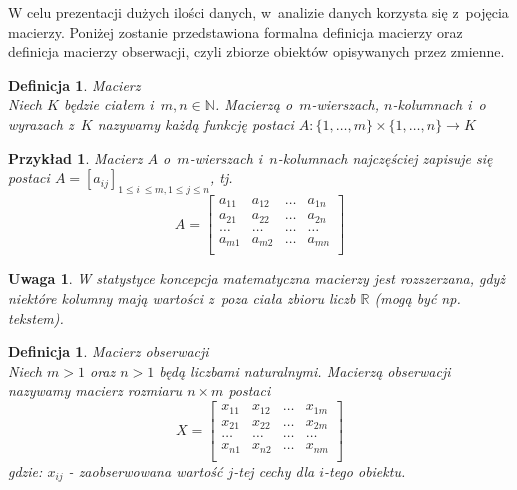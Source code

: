\documentclass[12pt,a4paper]{report}
\newtheorem{definition}[theorem]{Definicja}
\newtheorem{uwaga}{Uwaga}
\newtheorem{example}{Przykład}
\begin{document}
W celu prezentacji dużych ilości danych, w~analizie danych korzysta się z~pojęcia macierzy. Poniżej zostanie przedstawiona formalna definicja macierzy oraz definicja macierzy obserwacji, czyli zbiorze obiektów opisywanych przez zmienne. %

\begin{definition}{Macierz \cite[Rozdział 1]{banaszak2002}}\\
Niech $K$ będzie ciałem i~$m, n \in \mathbb{N}$. Macierzą o~$m$-wierszach, $n$-kolumnach i~o wyrazach z~$K$ nazywamy każdą funkcję postaci
$A: \{1,\ldots, m \} \times \{1, \ldots, n\} \rightarrow K$
\end{definition}

\begin{example}
Macierz $A$ o~$m$-wierszach i~$n$-kolumnach najczęściej zapisuje się postaci $A=[a_{ij}]_{1\leq i~\leq m,  1\leq j\leq n}$, tj. 
$$
A= \begin{bmatrix}
a_{11} & a_{12} & \ldots & a_{1n} \\
a_{21} & a_{22} & \ldots & a_{2n}\\ 
\ldots & \ldots & \ldots & \ldots\\
a_{m1} & a_{m2} & \ldots & a_{mn} \\
\end{bmatrix}    
$$
\end{example}

\begin{uwaga}
W statystyce koncepcja matematyczna macierzy jest rozszerzana, gdyż niektóre kolumny mają wartości z~poza ciała zbioru liczb $\mathbb{R}$ (mogą być np. tekstem).
\end{uwaga}

\begin{definition}{Macierz obserwacji \cite[Rozdział 2]{mlodak2006}}\\
Niech $m>1$ oraz $n>1$ będą liczbami naturalnymi.  Macierzą obserwacji nazywamy macierz rozmiaru  $n \times m$  postaci
$$
X= \begin{bmatrix}
x_{11} & x_{12} & \ldots & x_{1m} \\
x_{21} & x_{22} & \ldots & x_{2m}\\
\ldots & \ldots & \ldots & \ldots \\
x_{n1} & x_{n2} & \ldots & x_{nm}\\
\end{bmatrix}
$$
gdzie:
$x_{ij}$ - zaobserwowana wartość $j$-tej cechy dla $i$-tego obiektu.
\end{definition}
\end{document}
